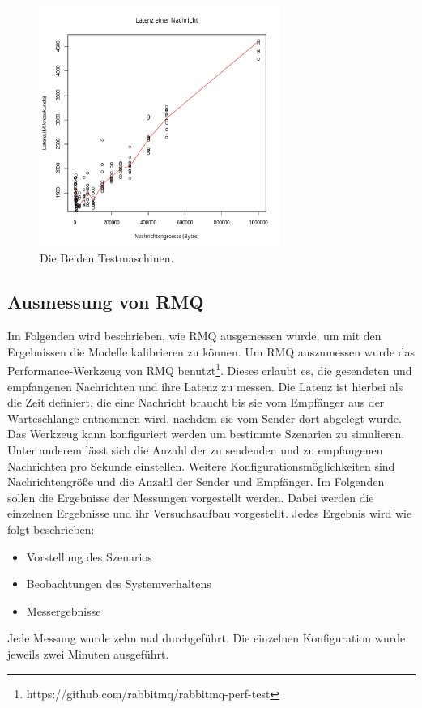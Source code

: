 \begin{figure}
\center
  \includegraphics[width=0.7\textwidth]{images/measurement/rate-limit-1-A.pdf}
  \caption{Die Beiden Testmaschinen.}
  \label{img:machineoverview}
\end{figure}

\subsection{Ausmessung von RMQ}
\label{sec:rmqBenchmark}
Im Folgenden wird beschrieben, wie RMQ ausgemessen wurde, um mit den Ergebnissen die Modelle kalibrieren zu können. Um RMQ auszumessen wurde das Performance-Werkzeug von RMQ benutzt\footnote{https://github.com/rabbitmq/rabbitmq-perf-test}. Dieses erlaubt es, die gesendeten und empfangenen Nachrichten und ihre Latenz zu messen. Die Latenz ist hierbei als die Zeit definiert, die eine Nachricht braucht bis sie vom Empfänger aus der Warteschlange entnommen wird, nachdem sie vom Sender dort abgelegt wurde. Das Werkzeug kann konfiguriert werden um bestimmte Szenarien zu simulieren. Unter anderem lässt sich die Anzahl der zu sendenden und zu empfangenen Nachrichten pro Sekunde einstellen. Weitere Konfigurationsmöglichkeiten sind Nachrichtengröße und die Anzahl der Sender und Empfänger. Im Folgenden sollen die Ergebnisse der Messungen vorgestellt werden. Dabei werden die einzelnen Ergebnisse und ihr Versuchsaufbau vorgestellt. Jedes Ergebnis wird wie folgt beschrieben: 
\begin{itemize}
    \item Vorstellung des Szenarios
    \item Beobachtungen des Systemverhaltens
    \item Messergebnisse
\end{itemize}
Jede Messung wurde zehn mal durchgeführt. Die einzelnen Konfiguration wurde jeweils zwei Minuten ausgeführt. 



